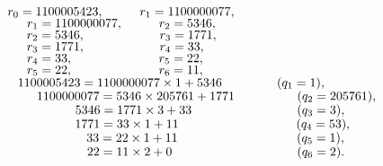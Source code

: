 \documentclass{mai_book}
\begin{document}
$\hspace*{1cm} r_0 = 1 100 005 423, \hspace*{1cm}r_1 = 1 100 000 077,$\\ 
$\hspace*{1.54cm} r_1 = 1 100 000 077,\hspace*{1cm} r_2 = 5 346, $\\
$\hspace*{1.54cm} r_2 = 5 346,\hspace*{2.08cm} r_3 = 1 771,$ \\
$\hspace*{1.54cm} r_3 = 1 771,\hspace*{2.08cm} r_4 = 33,$ \\
$\hspace*{1.54cm} r_4 = 33,\hspace*{2.4cm} r_5 = 22, $\\
$\hspace*{1.54cm} r_5 = 22,\hspace*{2.4cm} r_6 = 11,$ \\

$\hspace*{1.28cm} 1 100 005 423 = 1 100 000 077\times 1 + 5346 \hspace*{1.54cm}(q_1 = 1),$\\
$\hspace*{1.8cm} 1 100 000 077 = 5 346\times 205 761+ 1 771\hspace*{1.75cm} (q_2 = 205 761),$\\
$\hspace*{2.88cm} 5 346 = 1 771\times 3 +33 \hspace*{2.95cm}(q_3 = 3),$\\
$\hspace*{2.88cm} 1 771 = 33\times 1 +11 \hspace*{3.3cm}(q_4 = 53),$\\
$\hspace*{3.21cm} 33 = 22\times 1 + 11 \hspace*{3.34cm}(q_5 = 1),$\\
$\hspace*{3.21cm} 22 = 11\times 2 + 0 \hspace*{3.5cm}(q_6 = 2).$\\
\end{document}
